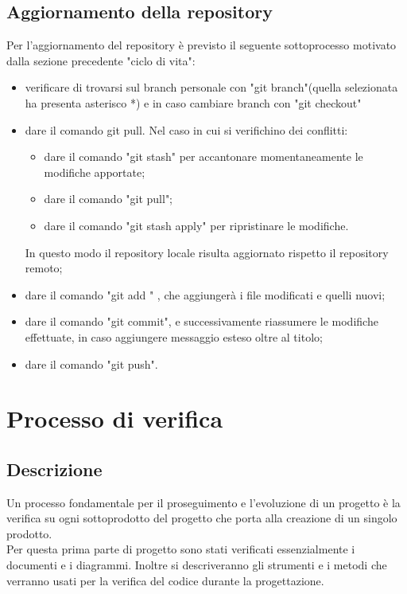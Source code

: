 \documentclass[NormeDiProgetto.tex]{subfiles}
\begin{document}
	\subsection{Aggiornamento della repository}
	Per l’aggiornamento del repository è previsto il seguente sottoprocesso motivato dalla sezione precedente "ciclo di vita":
	\begin{itemize}
		\item verificare di trovarsi sul branch personale con "git branch"(quella selezionata ha presenta asterisco *) e in caso cambiare branch con "git checkout"
		\item dare il comando git pull. Nel caso in cui si verifichino dei conflitti:
		\begin{itemize}
			\item dare il comando "git stash" per accantonare momentaneamente	le modifiche apportate;
			\item dare il comando "git pull";
			\item dare il comando "git stash apply" per ripristinare le modifiche.
		\end{itemize}	In questo modo il repository locale risulta aggiornato rispetto il repository remoto;
	
		\item dare il comando "git add \textasteriskcentered" , che aggiungerà i file modificati e quelli nuovi;
		\item dare il comando "git commit", e successivamente riassumere le modifiche effettuate, in caso aggiungere messaggio esteso oltre al titolo;
		\item dare il comando "git push".
	\end{itemize}
	
	\section{Processo di verifica}
	
	\subsection{Descrizione}
	Un processo fondamentale per il proseguimento e l'evoluzione di un progetto è la verifica su ogni sottoprodotto del progetto che porta alla creazione di un singolo prodotto.\\
	Per questa prima parte di progetto sono stati verificati essenzialmente i documenti e i diagrammi. Inoltre si descriveranno gli strumenti e i metodi che verranno usati per la verifica del codice durante la progettazione.
	
\end{document}
